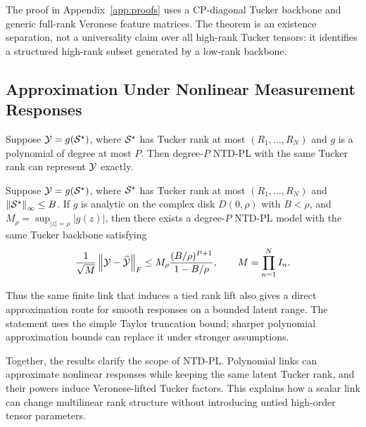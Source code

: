 The proof in Appendix~\ref{app:proofs} uses a CP-diagonal Tucker backbone and
generic full-rank Veronese feature matrices. The theorem is an existence
separation, not a universality claim over all high-rank Tucker tensors: it
identifies a structured high-rank subset generated by a low-rank
backbone.

\subsection{Approximation Under Nonlinear Measurement Responses}

\begin{theorem}
\label{thm:poly-generation}
Suppose \(\mathcal{Y} = g(\mathcal{S}^\star)\), where \(\mathcal{S}^\star\) has Tucker rank at most
\((R_1,\ldots,R_N)\) and \(g\) is a polynomial of degree at most \(P\). Then
degree-\(P\) NTD-PL with the same Tucker rank can represent \(\mathcal{Y}\) exactly.
\end{theorem}

\begin{theorem}
\label{thm:analytic-approx}
Suppose \(\mathcal{Y}=g(\mathcal{S}^\star)\), where \(\mathcal{S}^\star\) has Tucker rank at most
\((R_1,\ldots,R_N)\) and \(\left\lVert \mathcal{S}^\star \right\rVert_\infty\le B\). If \(g\) is
analytic on the complex disk \(D(0,\rho)\) with \(B<\rho\), and
\(M_\rho=\sup_{|z|=\rho}|g(z)|\), then there exists a degree-\(P\) NTD-PL
model with the same Tucker backbone satisfying
\begin{equation}
  \frac{1}{\sqrt{M}}\left\lVert \mathcal{Y}-\widehat{\mathcal{Y}} \right\rVert_F
  \le
  M_\rho
  \frac{(B/\rho)^{P+1}}{1-B/\rho},
  \qquad
  M=\prod_{n=1}^{N} I_n.
\end{equation}
\end{theorem}

Thus the same finite link that induces a tied rank lift also gives a direct
approximation route for smooth responses on a bounded latent range.
The statement uses the simple Taylor truncation bound; sharper polynomial
approximation bounds can replace it under stronger assumptions.

Together, the results clarify the scope of NTD-PL. Polynomial links can
approximate nonlinear responses while keeping the same latent
Tucker rank, and their powers induce Veronese-lifted Tucker factors. This
explains how a scalar link can change multilinear rank structure without
introducing untied high-order tensor parameters.
